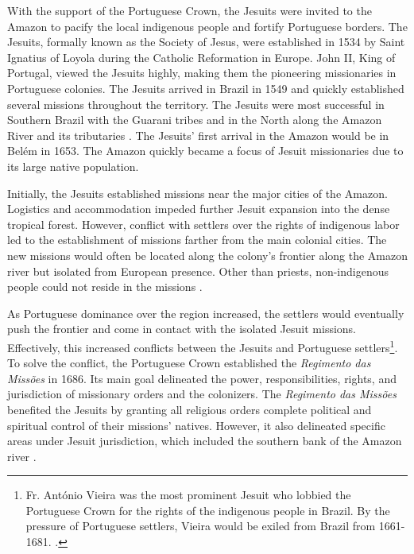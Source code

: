 \documentclass{article}
\begin{document}

With the support of the Portuguese Crown, the Jesuits were invited to the Amazon to pacify the local indigenous people and fortify Portuguese borders. 
The Jesuits, formally known as the Society of Jesus, were established in 1534 by Saint Ignatius of Loyola during the Catholic Reformation in Europe. 
John II, King of Portugal, viewed the Jesuits highly, making them the pioneering missionaries in Portuguese colonies. 
The Jesuits arrived in Brazil in 1549 and quickly established several missions throughout the territory. 
The Jesuits were most successful in Southern Brazil with the Guarani tribes and in the North along the Amazon River and its tributaries \parencite[p.~3]{Hemming1987-vj}. 
The Jesuits' first arrival in the Amazon would be in Belém in 1653. 
The Amazon quickly became a focus of Jesuit missionaries due to its large native population.

Initially, the Jesuits established missions near the major cities of the Amazon. Logistics and accommodation impeded further Jesuit expansion into the dense tropical forest. However, conflict with settlers over the rights of indigenous labor led to the establishment of missions farther from the main colonial cities. The new missions would often be located along the colony's frontier along the Amazon river but isolated from European presence. Other than priests, non-indigenous people could not reside in the missions \parencite[p.~100]{Cardoso1984-ic}. 

As Portuguese dominance over the region increased, the settlers would eventually push the frontier and come in contact with the isolated Jesuit missions. 
Effectively, this increased conflicts between the Jesuits and Portuguese settlers\footnote{Fr. António Vieira was the most prominent Jesuit who lobbied the Portuguese Crown for the rights of the indigenous people in Brazil. By the pressure of Portuguese settlers, Vieira would be exiled from Brazil from 1661-1681. \parencite{Zeron2015-of}.}. 
To solve the conflict, the Portuguese Crown established the \textit{Regimento das Missões} in 1686. 
Its main goal delineated the power, responsibilities, rights, and jurisdiction of missionary orders and the colonizers. 
The \textit{Regimento das Missões} benefited the Jesuits by granting all religious orders complete political and spiritual control of their missions' natives. 
However, it also delineated specific areas under Jesuit jurisdiction, which included the southern bank of the Amazon river \parencite{Chambouleyron2019-tr}.
\end{document}
